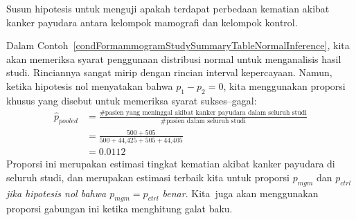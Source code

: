 
\begin{exercisewrap}
\begin{nexercise} \label{htFormammogramStudySummaryTable}
Susun hipotesis untuk menguji apakah terdapat perbedaan
kematian akibat kanker payudara antara kelompok mamografi dan kelompok kontrol.\footnotemark
\end{nexercise}
\end{exercisewrap}

Dalam Contoh~\ref{condFormammogramStudySummaryTableNormalInference},
kita akan memeriksa syarat penggunaan distribusi normal untuk
menganalisis hasil studi.
Rinciannya sangat mirip dengan rincian interval kepercayaan.
Namun, ketika hipotesis nol menyatakan bahwa $p_1 - p_2 = 0$,
kita menggunakan proporsi khusus yang disebut
 untuk memeriksa syarat sukses--gagal:
\begin{align*}
\hat{p}_{\textit{pooled}}
    &= \frac
        {\text{\# pasien yang meninggal akibat kanker payudara dalam
            seluruh studi}}
        {\text{\# pasien dalam seluruh studi}} \\
	&= \frac{500 + 505}{500 + \text{44,425} + 505 + \text{44,405}} \\
	&= 0.0112
\end{align*}
Proporsi ini merupakan estimasi tingkat kematian akibat kanker payudara
di seluruh studi, dan merupakan estimasi terbaik kita untuk
proporsi $p_{mgm}$ dan $p_{ctrl}$
\emph{jika hipotesis nol bahwa $p_{mgm} = p_{ctrl}$ benar}.
Kita~juga akan menggunakan proporsi gabungan ini ketika menghitung
galat baku.


